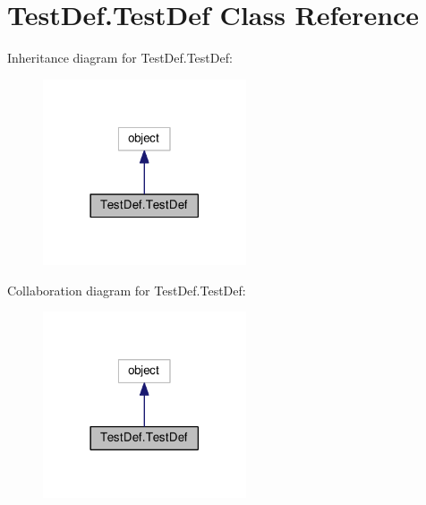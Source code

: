 \hypertarget{class_test_def_1_1_test_def}{\section{Test\-Def.\-Test\-Def Class Reference}
\label{class_test_def_1_1_test_def}
}


Inheritance diagram for Test\-Def.\-Test\-Def\-:
\nopagebreak
\begin{figure}[H]
\begin{center}
\leavevmode
\includegraphics[width=170pt]{class_test_def_1_1_test_def__inherit__graph}
\end{center}
\end{figure}


Collaboration diagram for Test\-Def.\-Test\-Def\-:
\nopagebreak
\begin{figure}[H]
\begin{center}
\leavevmode
\includegraphics[width=170pt]{class_test_def_1_1_test_def__coll__graph}
\end{center}
\end{figure}
